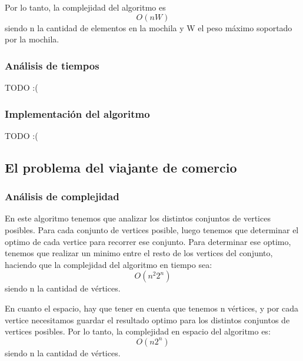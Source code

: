 Por lo tanto, la complejidad del algoritmo es
$$ O(n W) $$ siendo n la cantidad de elementos en la mochila y W el peso máximo soportado por la mochila.

\subsubsection{Análisis de tiempos}
TODO :(
\newpage

\subsubsection{Implementación del algoritmo}
TODO :(
\newpage

\subsection{El problema del viajante de comercio}
\subsubsection{Análisis de complejidad}
En este algoritmo tenemos que analizar los distintos conjuntos de vertices posibles. Para cada conjunto de vertices posible, luego tenemos que determinar el optimo de cada vertice para recorrer ese conjunto.
Para determinar ese optimo, tenemos que realizar un minimo entre el resto de los vertices del conjunto, haciendo que la complejidad del algoritmo en tiempo sea:
$$O(n^2 2^n)$$
siendo n la cantidad de vértices.

En cuanto el espacio, hay que tener en cuenta que tenemos n vértices, y por cada vertice necesitamos guardar el resultado optimo para los distintos conjuntos de vertices posibles.
Por lo tanto, la complejidad en espacio del algoritmo es:
$$O(n 2^n)$$
siendo n la cantidad de vértices.

